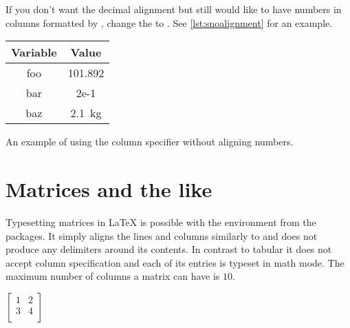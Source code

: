 If you don't want the decimal alignment but still would like to have
numbers in columns formatted by , change the
 to . See \autoref{lst:snoalignment}
for an example.
\begin{listing}
  \begin{example}
\begin{tabular}{@{}cS@{}}
  \toprule
  Variable & {Value} \\
  \midrule
  foo & 101.892 \\
  bar & 2e-1 \\
  baz & \qty{2.1}{\kg}  \\
  \bottomrule
\end{tabular}
\end{example}
  \caption{An example of using the  column specifier without aligning
    numbers.}\label{lst:snoalignment}
\end{listing}

\section{Matrices and the like}\label{sec:arraymat}

Typesetting matrices in \LaTeX{} is possible with the 
environment from the  packages. It simply aligns the lines and
columns similarly to  and does not produce any delimiters around
its contents. In contrast to tabular it does not accept column specification
and each of its entries is typeset in math mode. The maximum number of columns a matrix can have is \(10\).
\begin{example}
\( \left[
  \begin{matrix}
  1 & 2 \\
  3 & 4 \\
  \end{matrix}
  \right] \)
\end{example}

